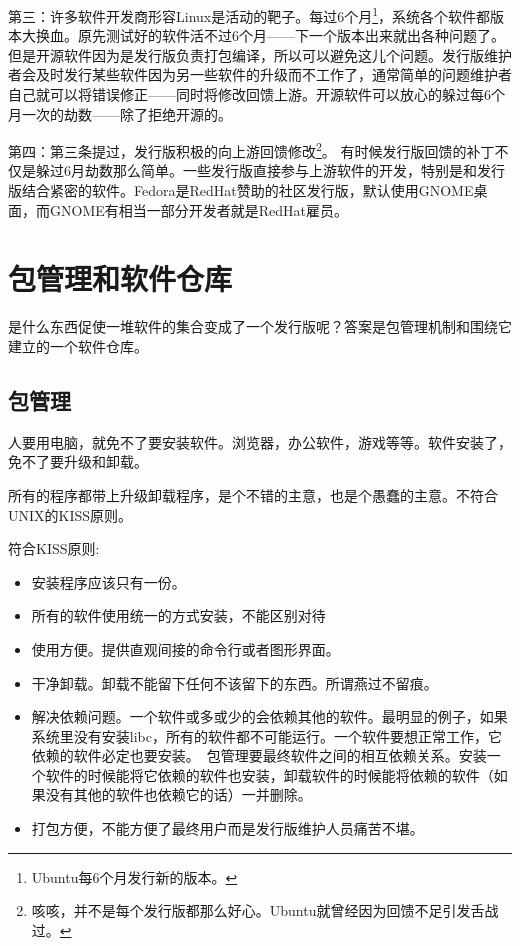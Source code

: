 \documentclass[amstex,twoside]{ctexbook}
\begin{document}
第三：许多软件开发商形容Linux是活动的靶子。每过6个月\footnote{Ubuntu每6个月发行新的版本。}，系统各个软件都版本大换血。原先测试好的软件活不过6个月——下一个版本出来就出各种问题了。但是开源软件因为是发行版负责打包编译，所以可以避免这儿个问题。发行版维护者会及时发行某些软件因为另一些软件的升级而不工作了，通常简单的问题维护者自己就可以将错误修正——同时将修改回馈上游。开源软件可以放心的躲过每6个月一次的劫数——除了拒绝开源的。

第四：第三条提过，发行版积极的向上游回馈修改\footnote{咳咳，并不是每个发行版都那么好心。Ubuntu就曾经因为回馈不足引发舌战过。}。
有时候发行版回馈的补丁不仅是躲过6月劫数那么简单。一些发行版直接参与上游软件的开发，特别是和发行版结合紧密的软件。Fedora是RedHat赞助的社区发行版，默认使用GNOME桌面，而GNOME有相当一部分开发者就是RedHat雇员。


\section{包管理和软件仓库}

是什么东西促使一堆软件的集合变成了一个发行版呢？答案是包管理机制和围绕它建立的一个软件仓库。

\subsection{包管理}

人要用电脑，就免不了要安装软件。浏览器，办公软件，游戏等等。软件安装了，免不了要升级和卸载。

所有的程序都带上升级卸载程序，是个不错的主意，也是个愚蠢的主意。不符合UNIX的KISS原则。

符合KISS原则:
\begin{itemize}
\item 安装程序应该只有一份。
\item 所有的软件使用统一的方式安装，不能区别对待

\item 使用方便。提供直观间接的命令行或者图形界面。

\item 干净卸载。卸载不能留下任何不该留下的东西。所谓燕过不留痕。

\item 解决依赖问题。一个软件或多或少的会依赖其他的软件。最明显的例子，如果系统里没有安装libc，所有的软件都不可能运行。一个软件要想正常工作，它依赖的软件必定也要安装。　包管理要最终软件之间的相互依赖关系。安装一个软件的时候能将它依赖的软件也安装，卸载软件的时候能将依赖的软件（如果没有其他的软件也依赖它的话）一并删除。

\item 打包方便，不能方便了最终用户而是发行版维护人员痛苦不堪。

\end{itemize}
\end{document}
